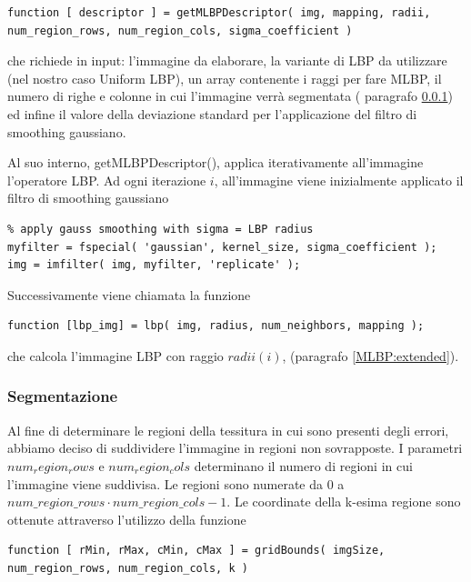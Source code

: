\begin{lstlisting}
function [ descriptor ] = getMLBPDescriptor( img, mapping, radii, num_region_rows, num_region_cols, sigma_coefficient )
\end{lstlisting}

che richiede in input: l'immagine da elaborare, la variante di \acs{LBP} da utilizzare (nel nostro caso Uniform LBP), un array contenente i raggi per fare \acs{MLBP}, il numero di righe e colonne in cui l'immagine verrà segmentata ( paragrafo \ref{imp:seg}) ed infine il valore della deviazione standard per l'applicazione del filtro di smoothing gaussiano.

Al suo interno, getMLBPDescriptor(), applica iterativamente all'immagine l'operatore \acs{LBP}.
Ad ogni iterazione $i$, all'immagine viene inizialmente applicato il filtro di smoothing gaussiano

\begin{lstlisting}
% apply gauss smoothing with sigma = LBP radius
myfilter = fspecial( 'gaussian', kernel_size, sigma_coefficient );
img = imfilter( img, myfilter, 'replicate' );
\end{lstlisting}

\noindent Successivamente viene chiamata la funzione\cite{lbpcode}

\begin{lstlisting}
function [lbp_img] = lbp( img, radius, num_neighbors, mapping );
\end{lstlisting}

\noindent che calcola l'immagine \acs{LBP} con raggio $radii(i)$, (paragrafo \ref{MLBP:extended}).

\subsubsection{Segmentazione}
\label{imp:seg}
Al fine di determinare le regioni della tessitura in cui sono presenti degli errori, abbiamo deciso di suddividere l'immagine in regioni non sovrapposte. I parametri $num_region_rows$ e $num_region_cols$ determinano il numero di regioni in cui l'immagine viene suddivisa.
Le regioni sono numerate da $0$ a $num\_region\_rows \cdot num\_region\_cols - 1$.
Le coordinate della k-esima regione sono ottenute attraverso l'utilizzo della funzione

\begin{lstlisting}
function [ rMin, rMax, cMin, cMax ] = gridBounds( imgSize, num_region_rows, num_region_cols, k )
\end{lstlisting}

